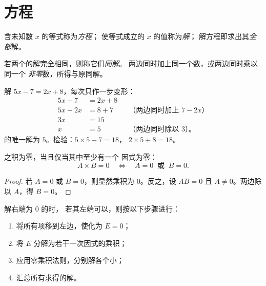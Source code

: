 \section{方程}

\begin{definition}[方程、解]\label{def:g10:algebra:equation}
含未知数 $x$ 的等式称为\emph{方程}；
使等式成立的 $x$ 的值称为\emph{解}；
解方程即求出其\emph{全部}解。
\end{definition}

若两个的解完全相同，则称它们\emph{同解}。
两边同时加上同一个数，或两边同时乘以同一个
\emph{非零}数，所得与原同解。

\begin{example}[一元一次方程]\label{ex:g10:algebra:firstdegree}
解 $5x - 7 = 2x + 8$，每次只作一步变形：
\begin{align*}
5x - 7 &= 2x + 8 \\
5x - 2x &= 8 + 7 && \text{（两边同时加上 $7 - 2x$）} \\
3x &= 15 \\
x &= 5 && \text{（两边同时除以 $3$）。}
\end{align*}
的唯一解为 $5$。检验：$5 \times 5 - 7 = 18$，
$2 \times 5 + 8 = 18$。
\end{example}

\begin{theorem}[零乘积法则]\label{thm:g10:algebra:zeroproduct}
之积为零，当且仅当其中至少有一个
因式为零：
\[
A \times B = 0
\quad\Longleftrightarrow\quad
A = 0 \ \text{ 或 } \ B = 0 .
\]
\end{theorem}

\begin{proof}
若 $A = 0$ 或 $B = 0$，则显然乘积为 $0$。反之，设
$AB = 0$ 且 $A \neq 0$。两边除以 $A$，得 $B = 0$。
\end{proof}

\begin{method}[用因式分解法解方程]\label{met:g10:algebra:zeroproduct}
解右端为 $0$ 的时，
若其左端可以，则按以下步骤进行：
\begin{enumerate}
  \item 将所有项移到左边，使化为 $E = 0$；
  \item 将 $E$ 分解为若干一次因式的乘积；
  \item 应用零乘积法则，分别解各个小；
  \item 汇总所有求得的解。
\end{enumerate}
\end{method}

